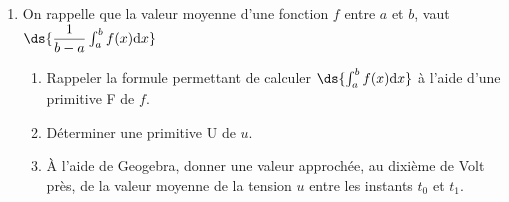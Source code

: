 \begin{enumerate}
	\smallskip
	
	$t_1=$\makebox[0.1\linewidth]{\dotfill}

	\smallskip
	
	\appelprof
	\item On rappelle que la valeur moyenne d'une fonction $f$ entre $a$ et $b$, vaut $\ds{\dfrac{1}{b-a}\int_a^bf(x)\text{d}x}$
	\begin{enumerate}
		\item Rappeler la formule permettant de calculer $\ds{\int_a^bf(x)\text{d}x}$ à l'aide d'une primitive F de $f$. \par \vspace*{0.5cm}

		
		\item Déterminer une primitive U de $u$.\par \vspace*{0.5cm}

		\item À l'aide de Geogebra, donner une valeur approchée, au dixième de Volt près, de la valeur moyenne de la tension $u$ entre les instants $t_0$ et $t_1$.\par \vspace*{0.5cm}

		
	\end{enumerate}
\end{enumerate}